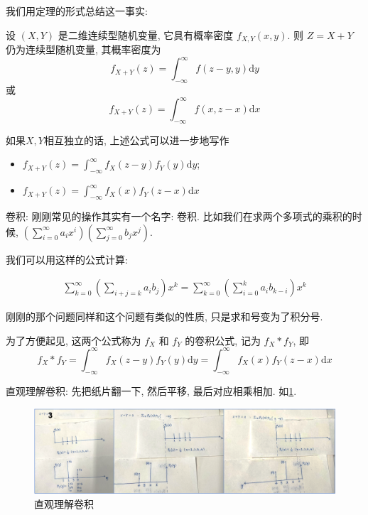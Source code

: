 我们用定理的形式总结这一事实: 
\begin{theorem}
    设 $(X, Y)$ 是二维连续型随机变量, 它具有概率密度 $f_{X,Y}(x, y)$. 则 $Z=X+Y$ 仍为连续型随机变量, 其概率密度为
    $$f_{X+Y}(z)=\int_{-\infty}^{\infty} f(z-y, y) \mathrm{d} y$$
    或
    $$
f_{X+Y}(z)=\int_{-\infty}^{\infty} f(x, z-x) \mathrm{d} x
$$
\end{theorem}

如果$X,Y$相互独立的话, 上述公式可以进一步地写作
\begin{itemize}
    \item $f_{X+Y}(z)=\int_{-\infty}^{\infty} f_X(z-y) f_Y(y) \mathrm{d} y$;
    \item $f_{X+Y}(z)=\int_{-\infty}^{\infty} f_X(x) f_Y(z-x) \mathrm{d} x$
\end{itemize}

\begin{asidebox}
    卷积: 刚刚常见的操作其实有一个名字: 卷积. 比如我们在求两个多项式的乘积的时候, $(\sum_{i=0}^{\infty} a_i x^i)(\sum_{j=0}^{\infty} b_j x^j).$

    我们可以用这样的公式计算: 

    $$
    \begin{aligned}
        \sum_{k=0}^{\infty}\left(\sum_{i+j=k} a_i b_j\right) x^k
        =\sum_{k=0}^{\infty}\left(\sum_{i=0}^k a_i b_{k-i}\right) x^k
    \end{aligned}
    $$

    刚刚的那个问题同样和这个问题有类似的性质, 只是求和号变为了积分号. 

\end{asidebox}

为了方便起见, 这两个公式称为 $f_X$ 和 $f_Y$ 的卷积公式, 记为 $f_X * f_Y$, 即
$$
f_X * f_Y=\int_{-\infty}^{\infty} f_X(z-y) f_Y(y) \mathrm{d} y=\int_{-\infty}^{\infty} f_X(x) f_Y(z-x) \mathrm{d} x
$$

\begin{asidebox}
    直观理解卷积: 先把纸片翻一下, 然后平移, 最后对应相乘相加. 如\cref{fig:convolution}.
\end{asidebox}

\begin{figure}
    \center
    \includegraphics[width=\textwidth]{fig/ch3/convolution.png}
    \caption{直观理解卷积}
    \label{fig:convolution}
\end{figure}


